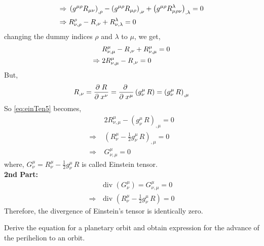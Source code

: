 \documentclass[../main-sheet.tex]{subfiles}
\begin{document}
\begin{soln}
\begin{align*}
                \Rightarrow\;&\left(g^{\mu \rho} R_{{\mu\nu}}\right)_{,\rho} - \left(g^{\mu \rho}R_{\mu \rho}\right)_{ ,\nu}+\left(g^{\mu \rho}R_{\mu \rho \nu}^\lambda\right)_{ ,\lambda}=0\\
                \Rightarrow\;&R_{\nu,\rho}^{\rho} - R_{ ,\nu}+R_{\nu,\lambda}^\lambda=0
            \end{align*}
            changing the dummy indices \(\rho\) and \(\lambda\) to \(\mu\), we get,
            \begin{align}
                &R_{\nu,\mu}^{\mu} - R_{ ,\nu}+R_{\nu,\mu}^\mu=0\notag\\
                \Rightarrow\;&2R_{\nu,\mu}^{\mu} - R_{ ,\nu}=0\label{eq:einTen5}
            \end{align}
            But,
            \[
                R_{,\nu}=\frac{\partial\;R}{\partial\; x^\nu}=\frac{\partial\;}{\partial\; x^\mu}\left( g^\mu_\nu\,R \right)=\left( g^\mu_\nu\,R \right)_{,\mu}
                \]
                So \eqref{eq:einTen5} becomes,
                \begin{align*}
                    &2R_{\nu,\mu}^{\mu} - \left( g^\mu_\nu\,R \right)_{,\mu}=0\\
                    \Rightarrow\;&\left(R_{\nu}^{\mu} - \frac{1}{2} g^\mu_\nu\,R \right)_{,\mu}=0\\
                    \Rightarrow\;&G_{\nu,\mu}^\mu=0
            \end{align*}
            where, \(G_{\nu}^\mu=R_{\nu}^{\mu} - \frac{1}{2} g^\mu_\nu\,R\) is called Einstein tensor.\\


            \textbf{2nd Part:}
            \begin{align*}
                & \text{div }\left( G_{\nu}^\mu \right)=G_{\nu,\mu}^\mu=0\\
                \Rightarrow\,& \text{div }\left( R_{\nu}^{\mu} - \frac{1}{2} g^\mu_\nu\,R \right)=0
            \end{align*}
            Therefore, the divergence of Einstein's tensor is identically zero.
    \end{soln}
    \begin{prob}
        Derive the equation for a planetary orbit and obtain expression for the advance of the perihelion to an orbit.
    \end{prob}
\end{document}
